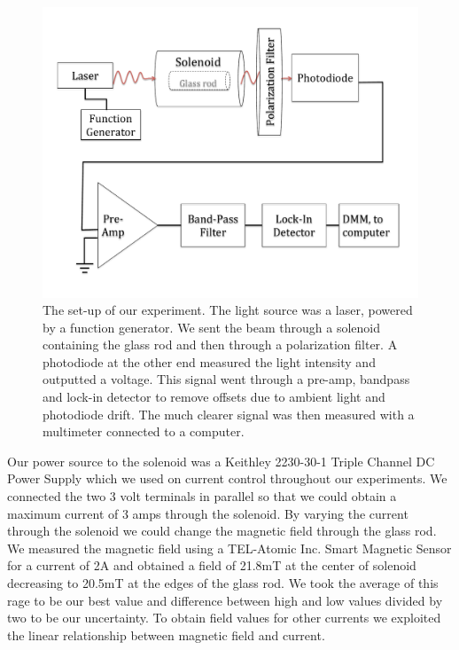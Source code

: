\documentclass[prb,preprint]{revtex4-1}
\begin{document}
\begin{figure}[h!]
\centering
\includegraphics[width=6in]{Faraday_lab_set-up.pdf}
\caption{The set-up of our experiment. The light source was a laser, powered by a function generator. We sent the beam through a solenoid containing the glass rod and then through a polarization filter. A photodiode at the other end measured the light intensity and outputted a voltage. This signal went through a pre-amp, bandpass and lock-in detector to remove offsets due to ambient light and photodiode drift. The much clearer signal was then measured with a multimeter connected to a computer.}
\label{set-up}
\end{figure}


Our power source to the solenoid was a Keithley 2230-30-1 Triple Channel DC Power Supply which we used on current control throughout our experiments. We connected the two 3 volt terminals in parallel so that we could obtain a maximum current of 3 amps through the solenoid. By varying the current through the solenoid we could change the magnetic field through the glass rod. We measured the magnetic field using a TEL-Atomic Inc. Smart Magnetic Sensor for a current of 2A and obtained a field of 21.8mT at the center of solenoid decreasing to 20.5mT at the edges of the glass rod. We took the average of this rage to be our best value and difference between high and low values divided by two to be our uncertainty. To obtain field values for other currents we exploited the linear relationship between magnetic field and current.
\end{document}
